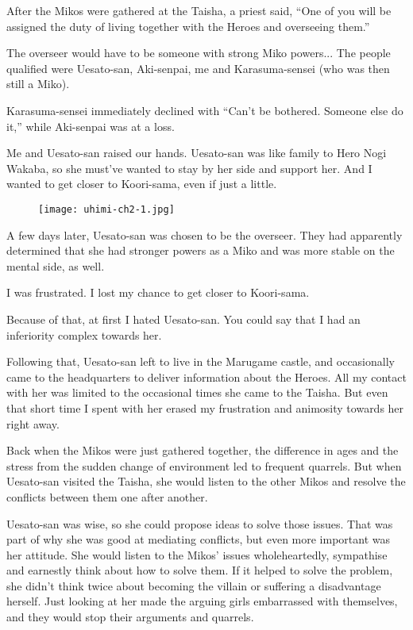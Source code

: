 After the Mikos were gathered at the Taisha, a priest said, ``One of you will be assigned the duty of living together with the Heroes and overseeing them.''

The overseer would have to be someone with strong Miko powers... The people qualified were Uesato-san, Aki-senpai, me and Karasuma-sensei (who was then still a Miko).

Karasuma-sensei immediately declined with ``Can't be bothered. Someone else do it,'' while Aki-senpai was at a loss.

Me and Uesato-san raised our hands. Uesato-san was like family to Hero Nogi Wakaba, so she must've wanted to stay by her side and support her. And I wanted to get closer to Koori-sama, even if just a little.

\begin{figure}[p]
\texttt{[image: uhimi-ch2-1.jpg]}
\end{figure}

A few days later, Uesato-san was chosen to be the overseer. They had apparently determined that she had stronger powers as a Miko and was more stable on the mental side, as well.

I was frustrated. I lost my chance to get closer to Koori-sama.

Because of that, at first I hated Uesato-san. You could say that I had an inferiority complex towards her.

Following that, Uesato-san left to live in the Marugame castle, and occasionally came to the headquarters to deliver information about the Heroes. All my contact with her was limited to the occasional times she came to the Taisha. But even that short time I spent with her erased my frustration and animosity towards her right away.

Back when the Mikos were just gathered together, the difference in ages and the stress from the sudden change of environment led to frequent quarrels. But when Uesato-san visited the Taisha, she would listen to the other Mikos and resolve the conflicts between them one after another.

Uesato-san was wise, so she could propose ideas to solve those issues. That was part of why she was good at mediating conflicts, but even more important was her attitude. She would listen to the Mikos' issues wholeheartedly, sympathise and earnestly think about how to solve them. If it helped to solve the problem, she didn't think twice about becoming the villain or suffering a disadvantage herself. Just looking at her made the arguing girls embarrassed with themselves, and they would stop their arguments and quarrels.

